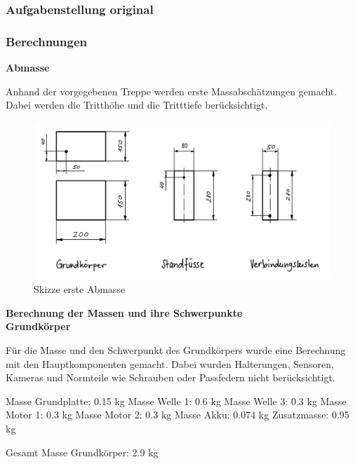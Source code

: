 
\subsubsection{Aufgabenstellung original}



\subsubsection{Berechnungen}

\textbf{Abmasse}

Anhand der vorgegebenen Treppe werden erste Massabschätzungen gemacht. Dabei werden die Tritthöhe und die Tritttiefe berücksichtigt.

\begin{figure}[H]
  \includegraphics[width=1
  \textwidth]{img/Treppensteigen/Erste Abmasse}
  \centering
  \caption{Skizze erste Abmasse}
\end{figure}

\textbf{Berechnung der Massen und ihre Schwerpunkte}\\

\textbf{Grundkörper}

Für die Masse und den Schwerpunkt des Grundkörpers wurde eine Berechnung mit den Hauptkomponenten gemacht. Dabei wurden Halterungen, Sensoren, Kameras und Normteile wie Schrauben oder Passfedern nicht berücksichtigt.

Masse Grundplatte: 0.15 kg
Masse Welle 1: 0.6 kg
Masse Welle 3: 0.3 kg
Masse Motor 1: 0.3 kg
Masse Motor 2: 0.3 kg
Masse Akku: 0.074 kg
Zusatzmasse: 0.95 kg

Gesamt Masse Grundkörper: 2.9 kg

